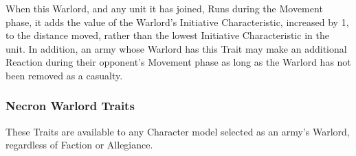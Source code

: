 \begin{multicols}{2}
\vspace*{1em}
When this Warlord, and any unit it has joined, Runs
during the Movement phase, it adds the value of the
Warlord’s Initiative Characteristic, increased by 1, to
the distance moved, rather than the lowest Initiative
Characteristic in the unit. In addition, an army whose
Warlord has this Trait may make an additional Reaction
during their opponent’s Movement phase as long as the
Warlord has not been removed as a casualty.

\end{multicols}

\subsubsection{Necron Warlord Traits}
These Traits are available to any Character model selected as an army’s Warlord, regardless of Faction or Allegiance.

